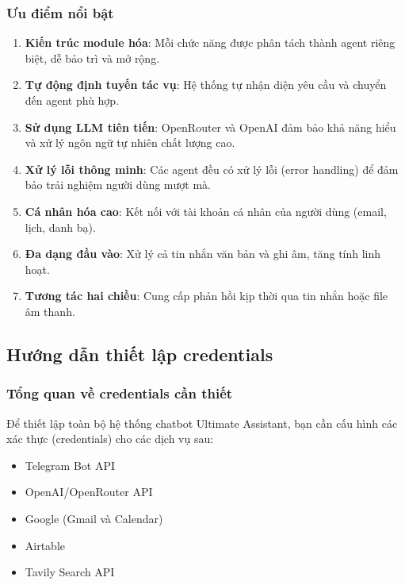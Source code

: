 \subsubsection{Ưu điểm nổi bật}
\begin{enumerate}
    \item \textbf{Kiến trúc module hóa}: Mỗi chức năng được phân tách thành agent riêng biệt, dễ bảo trì và mở rộng.
    
    \item \textbf{Tự động định tuyến tác vụ}: Hệ thống tự nhận diện yêu cầu và chuyển đến agent phù hợp.
    
    \item \textbf{Sử dụng LLM tiên tiến}: OpenRouter và OpenAI đảm bảo khả năng hiểu và xử lý ngôn ngữ tự nhiên chất lượng cao.
    
    \item \textbf{Xử lý lỗi thông minh}: Các agent đều có xử lý lỗi (error handling) để đảm bảo trải nghiệm người dùng mượt mà.
    
    \item \textbf{Cá nhân hóa cao}: Kết nối với tài khoản cá nhân của người dùng (email, lịch, danh bạ).
    
    \item \textbf{Đa dạng đầu vào}: Xử lý cả tin nhắn văn bản và ghi âm, tăng tính linh hoạt.
    
    \item \textbf{Tương tác hai chiều}: Cung cấp phản hồi kịp thời qua tin nhắn hoặc file âm thanh.
\end{enumerate}

\subsection{Hướng dẫn thiết lập credentials}

\subsubsection{Tổng quan về credentials cần thiết}
Để thiết lập toàn bộ hệ thống chatbot Ultimate Assistant, bạn cần cấu hình các xác thực (credentials) cho các dịch vụ sau:

\begin{itemize}
    \item Telegram Bot API
    \item OpenAI/OpenRouter API
    \item Google (Gmail và Calendar)
    \item Airtable
    \item Tavily Search API
\end{itemize}

